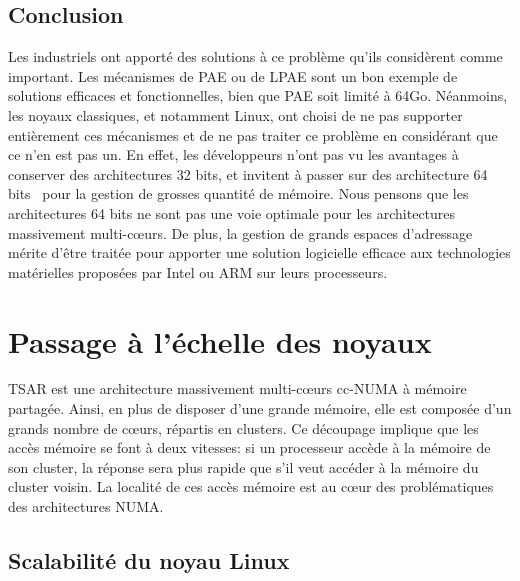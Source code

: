    \subsection{Conclusion}

      Les industriels ont apporté des solutions à ce problème qu'ils considèrent
      comme important. Les mécanismes de PAE ou de LPAE sont un bon exemple de
      solutions efficaces et fonctionnelles, bien que PAE soit limité à
      64Go. Néanmoins, les noyaux classiques, et notamment Linux, ont choisi de
      ne pas supporter entièrement ces mécanismes et de ne pas traiter ce
      problème en considérant que ce n'en est pas un. En effet, les développeurs
      n'ont pas vu les avantages à conserver des architectures 32 bits, et
      invitent à passer sur des architecture 64
      bits~\citep{gorman2004understanding} pour la gestion de grosses quantité
      de mémoire. Nous pensons que les architectures 64 bits ne sont pas une
      voie optimale pour les architectures massivement multi-c\oe urs. De plus,
      la gestion de grands espaces d'adressage mérite d'être traitée pour
      apporter une solution logicielle efficace aux technologies matérielles
      proposées par Intel ou ARM sur leurs processeurs.

  
  \section{Passage à l’échelle des noyaux}
  \label{sec:scalability}

    TSAR est une architecture massivement multi-c\oe urs
    cc-NUMA à
    mémoire partagée. Ainsi, en plus de disposer d'une grande mémoire, elle est
    composée d'un grands nombre de c\oe urs, répartis en clusters. Ce découpage
    implique que les accès mémoire se font à deux vitesses: si un processeur
    accède à la mémoire de son cluster, la réponse sera plus rapide que s'il
    veut accéder à la mémoire du cluster voisin. La localité de ces accès
    mémoire est au c\oe ur des problématiques des architectures NUMA. %


    \subsection{Scalabilité du noyau Linux}

